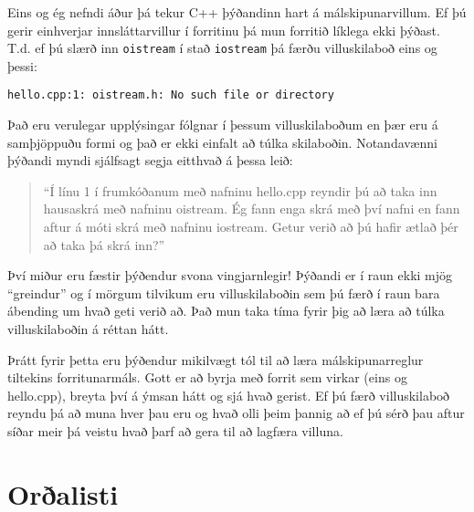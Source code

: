 Eins og ég nefndi áður þá tekur C++ þýðandinn hart á málskipunarvillum.
Ef þú gerir einhverjar innsláttarvillur í forritinu þá mun forritið líklega ekki þýðast.
T.d. ef þú slærð inn {\tt oistream} í stað {\tt iostream} þá færðu villuskilaboð eins og þessi:

\begin{verbatim}
hello.cpp:1: oistream.h: No such file or directory
\end{verbatim}
%
Það eru verulegar upplýsingar fólgnar í þessum villuskilaboðum en þær eru á samþjöppuðu formi og það er ekki einfalt að túlka skilaboðin.
Notandavænni þýðandi myndi sjálfsagt segja eitthvað á þessa leið: 

\begin{quote}
``Í línu 1 í frumkóðanum með nafninu hello.cpp reyndir þú að taka inn hausaskrá með nafninu oistream.
Ég fann enga skrá með því nafni en fann aftur á móti skrá með nafninu iostream.
Getur verið að þú hafir ætlað þér að taka þá skrá inn?''
\end{quote}

Því miður eru fæstir þýðendur svona vingjarnlegir!
Þýðandi er í raun ekki mjög ``greindur'' og í mörgum tilvikum eru villuskilaboðin sem þú færð í raun bara ábending um hvað geti verið að.
Það mun taka tíma fyrir þig að læra að túlka villuskilaboðin á réttan hátt.

Þrátt fyrir þetta eru þýðendur mikilvægt tól til að læra málskipunarreglur tiltekins forritunarmáls.
Gott er að byrja með forrit sem virkar (eins og hello.cpp), breyta því á ýmsan hátt og sjá hvað gerist.
Ef þú færð villuskilaboð reyndu þá að muna hver þau eru og hvað olli þeim þannig að ef þú sérð þau aftur síðar meir þá veistu hvað þarf að gera til að lagfæra villuna.

\section{Orðalisti}


